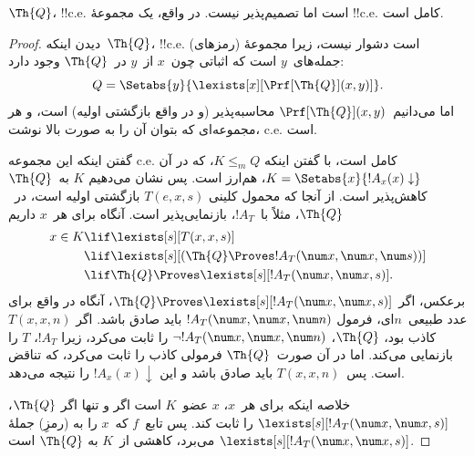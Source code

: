 \documentclass[../../../include/open-logic-section]{subfiles}
\begin{document}



\begin{thm}
$\Th{Q}$، !!{c.e.} است اما تصمیم‌پذیر نیست. در واقع، یک مجموعهٔ
!!{c.e.} کامل است.
\end{thm}

\begin{proof}
دیدن اینکه~$\Th{Q}$، !!{c.e.} است دشوار نیست، زیرا مجموعهٔ
(رمزهای) جمله‌های~$y$ است که اثباتی چون~$x$ از~$y$ در~$\Th{Q}$
وجود دارد:
\[
Q = \Setabs{y}{\lexists[x][\Prf[\Th{Q}](x,y)]}.
\]
اما می‌دانیم~$\Prf[\Th{Q}](x,y)$ محاسبه‌پذیر (و در واقع بازگشتی
اولیه) است، و هر مجموعه‌ای که بتوان آن را به صورت بالا نوشت، c.e.
است.

گفتن اینکه این مجموعه c.e. کامل است، با گفتن اینکه
$K \leq_m Q$، که در آن
$K = \Setabs{x}{!A_x(x) \downarrow}$، هم‌ارز است. پس نشان می‌دهیم
$K$ به~$\Th{Q}$ کاهش‌پذیر است. از آنجا که محمول کلینی
$T(e,x,s)$ بازگشتی اولیه است، در~$\Th{Q}$، مثلاً با~$!A_T$،
بازنمایی‌پذیر است. آنگاه برای هر~$x$ داریم
\begin{align*}
x \in K & \lif \lexists[s][T(x,x,s)] \\
& \lif \lexists[s][(\Th{Q} \Proves !A_T(\num x,\num x, \num s))]
  \\
& \lif \Th{Q} \Proves \lexists[s][!A_T(\num x, \num x, s)].
\end{align*}
برعکس، اگر
$\Th{Q} \Proves \lexists[s][!A_T(\num x, \num x, s)]$، آنگاه در
واقع برای عدد طبیعی~$n$ای، فرمول
$!A_T(\num x, \num x, \num n)$ باید صادق باشد. اگر
$T(x,x,n)$ کاذب بود، $\Th{Q}$،
$\lnot !A_T(\num x, \num x, \num n)$ را ثابت می‌کرد، زیرا
$!A_T$، $T$ را بازنمایی می‌کند.
اما در آن صورت~$\Th{Q}$ فرمولی کاذب را ثابت می‌کرد، که تناقض است.
پس~$T(x,x,n)$ باید صادق باشد و این
$!A_x(x) \downarrow$ را نتیجه می‌دهد.

خلاصه اینکه برای هر~$x$، $x$ عضو~$K$ است اگر و تنها اگر
$\Th{Q}$، $\lexists[s][!A_T(\num x,\num x,s)]$ را ثابت کند. پس
تابع~$f$ که~$x$ را به (رمزِ) جملهٔ
$\lexists[s][!A_T(\num x, \num x, s)]$ می‌برد، کاهشی از~$K$ به
$\Th{Q}$ است.
\end{proof}
\end{document}
